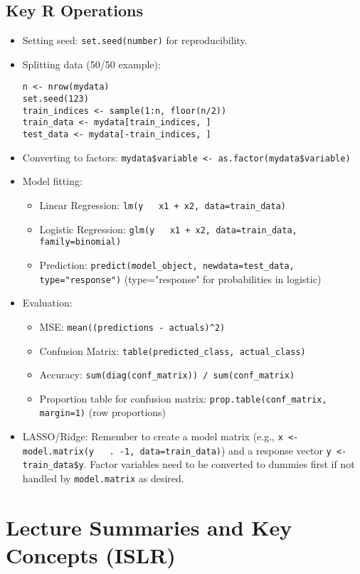 \documentclass[12pt,a4paper]{article}
\begin{document}
\subsection{Key R Operations}
\begin{itemize}
    \item Setting seed: \texttt{set.seed(number)} for reproducibility.
    \item Splitting data (50/50 example):
\begin{lstlisting}
n <- nrow(mydata)
set.seed(123)
train_indices <- sample(1:n, floor(n/2))
train_data <- mydata[train_indices, ]
test_data <- mydata[-train_indices, ]
\end{lstlisting}
    \item Converting to factors: \texttt{mydata\$variable <- as.factor(mydata\$variable)}
    \item Model fitting:
    \begin{itemize}
        \item Linear Regression: \texttt{lm(y \string~ x1 + x2, data=train_data)}
        \item Logistic Regression: \texttt{glm(y ~ x1 + x2, data=train_data, family=binomial)}
        \item Prediction: \texttt{predict(model_object, newdata=test_data, type="response")} (type="response" for probabilities in logistic)
    \end{itemize}
    \item Evaluation:
    \begin{itemize}
        \item MSE: \texttt{mean((predictions - actuals)\textasciicircum{}2)}
        \item Confusion Matrix: \texttt{table(predicted_class, actual_class)}
        \item Accuracy: \texttt{sum(diag(conf_matrix)) / sum(conf_matrix)}
        \item Proportion table for confusion matrix: \texttt{prop.table(conf_matrix, margin=1)} (row proportions)
    \end{itemize}
    \item LASSO/Ridge: Remember to create a model matrix (e.g., \texttt{x <- model.matrix(y ~ . -1, data=train_data)}) and a response vector \texttt{y <- train_data\$y}. Factor variables need to be converted to dummies first if not handled by \texttt{model.matrix} as desired.
\end{itemize}

\section{Lecture Summaries and Key Concepts (ISLR)}
\end{document}

